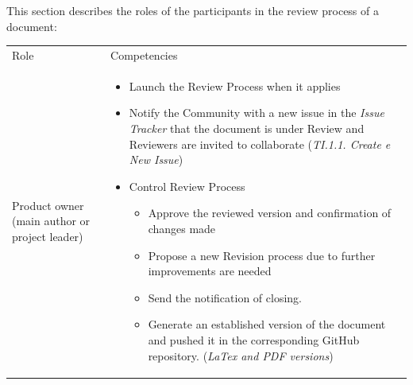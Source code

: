 \documentclass{template/openetcs_article}
\begin{document}
This section describes the roles of the participants in the review process of a document:

\begin{flushleft}
\begin{tabular}{|m{3cm}|m{11cm}|}
\hline
\rowcolor{myblue}
\multicolumn{2}{|c|}{Roles} \\\hline
\rowcolor{lightgray}
Role &
Competencies \\\hline
Product owner (main author or project leader) &
\begin{itemize}
\item Launch the Review Process when it applies
\item Notify the Community with a new issue in the {\it Issue Tracker} that the document is under Review and Reviewers are invited to collaborate ({\it TI.1.1. Create e New Issue})
\item Control Review Process 
\begin{itemize}
\item Approve the reviewed version and confirmation of changes made 
\item Propose a new Revision process due to further improvements are needed 
\item Send the notification of closing. 
\item Generate an established version of the document and pushed it in the corresponding GitHub repository. ({\it LaTex and PDF versions})
\end{itemize}
\end{itemize}
\\\hline
\end{tabular}
\end{flushleft}
\end{document}
